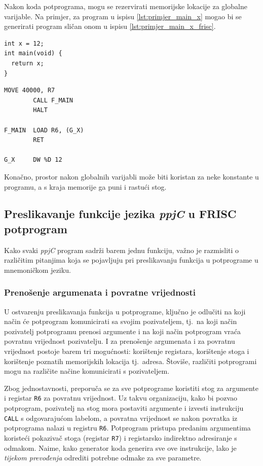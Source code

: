 \documentclass[times, 12pt, utf8]{book}
\begin{document}
Nakon koda potprograma, mogu se rezervirati memorijske lokacije za globalne varijable.
Na primjer, za program u ispisu \ref{lst:primjer_main_x} mogao bi se generirati program sličan onom u ispisu \ref{lst:primjer_main_x_frisc}.

\begin{lstlisting}[caption={Jednostavan \emph{ppjC} program s globalnom varijablom.},label=lst:primjer_main_x]
int x = 12;
int main(void) {
  return x;
}
\end{lstlisting}

\begin{lstlisting}[caption={Mogući generirani FRISC mnemonički program za ispis \ref{lst:primjer_main_x}.},label=lst:primjer_main_x_frisc]
        MOVE 40000, R7
        CALL F_MAIN
        HALT
        
F_MAIN  LOAD R6, (G_X)
        RET

G_X     DW %D 12
\end{lstlisting}

Konačno, prostor nakon globalnih varijabli može biti koristan za neke konstante u programu, a s kraja memorije ga puni i rastući stog.

\subsection{Preslikavanje funkcije jezika \emph{ppjC} u FRISC potprogram}\label{sec:funkcija->potprogram}
Kako svaki \emph{ppjC} program sadrži barem jednu funkciju, važno je razmisliti o različitim pitanjima koja se pojavljuju pri preslikavanju funkcija u potprograme u mnemoničkom jeziku.

\subsubsection{Prenošenje argumenata i povratne vrijednosti}\label{sec:argumenti_i_povratne_vrijednosti}
U ostvarenju preslikavanja funkcija u potprograme, ključno je odlučiti na koji način će potprogram komunicirati sa svojim pozivateljem, tj.~na koji način pozivatelj potprogramu prenosi argumente i na koji način potprogram vraća povratnu vrijednost pozivatelju.
I za prenošenje argumenata i za povratnu vrijednost postoje barem tri mogućnosti: korištenje registara, korištenje stoga i korištenje poznatih memorijskih lokacija tj.~adresa.
Štoviše, različiti potprogrami mogu na različite načine komunicirati s pozivateljem.

Zbog jednostavnosti, preporuča se za sve potprograme koristiti stog za argumente i registar \verb|R6| za povratnu vrijednost.
Uz takvu organizaciju, kako bi pozvao potprogram, pozivatelj na stog mora postaviti argumente i izvesti instrukciju \verb|CALL| s odgovarajućom labelom, a povratna vrijednost se nakon povratka iz potprograma nalazi u registru \verb|R6|.
Potprogram pristupa predanim argumentima koristeći pokazivač stoga (registar \verb|R7|) i registarsko indirektno adresiranje s odmakom.
Naime, kako generator koda generira sve ove instrukcije, lako je \emph{tijekom prevođenja} odrediti potrebne odmake za sve parametre.
\end{document}
